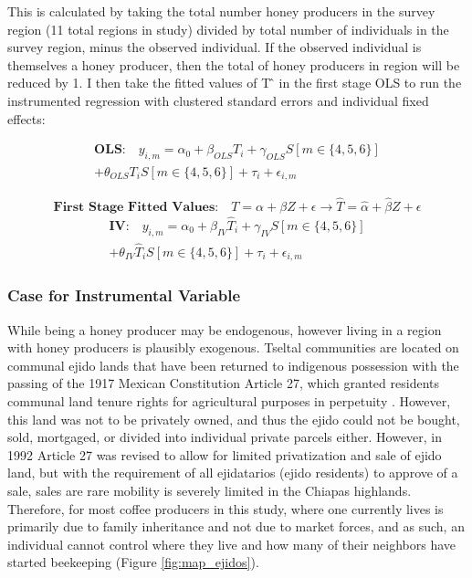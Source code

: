 \documentclass[../main.tex]{subfiles}
\begin{document}
This is calculated by taking the total number honey producers in the survey region (11 total regions in study) divided by total number of individuals in the survey region, minus the observed individual. If the observed individual is themselves a honey producer, then the total of honey producers in region will be reduced by 1. I then take the fitted values of T ̂ in the first stage OLS to run the instrumented regression with clustered standard errors and individual fixed effects:

\begin{multline}
\label{eq:2sls_OLS}
\textbf{OLS:}\quad y_{i,m} = \alpha_0 + \beta_{OLS}{T}_{i} + \gamma _{OLS}{S}[m \in \{4,5,6\}] \\ + \theta_{OLS}{T}_{i}{S}[m \in \{4,5,6\}] + \tau_{i} + \epsilon_{i,m}    
\end{multline}

\begin{equation}
\label{eq:2sls_1st_Stage}
\textbf{First Stage Fitted Values:}\quad T = \alpha + \beta{Z} + \epsilon \to \hat{T} = \hat{\alpha} + \hat{\beta}Z + \epsilon 
\end{equation}
\begin{multline}
\label{eq:2sls_2nd_Stage}
\textbf{IV:}\quad y_{i,m} = \alpha_0 + \beta_{IV}\hat{T}_{i} + \gamma_{IV}{S}[m \in \{4,5,6\}] \\ +  \theta_{IV}\hat{T}_{i}{S}[m \in \{4,5,6\}] + \tau_{i} + \epsilon_{i,m}    
\end{multline}

\subsubsection{Case for Instrumental Variable}

While being a honey producer may be endogenous, however living in a region with honey producers is plausibly exogenous. Tseltal communities are located on communal ejido lands that have been returned to indigenous possession with the passing of the 1917 Mexican Constitution Article 27, which granted residents communal land tenure rights for agricultural purposes in perpetuity \parencite{jones_privatizing_1998}. However, this land was not to be privately owned, and thus the ejido could not be bought, sold, mortgaged, or divided into individual private parcels either. However, in 1992 Article 27 was revised to allow for limited privatization and sale of ejido land, but with the requirement of all ejidatarios (ejido residents) to approve of a sale, sales are rare mobility is severely limited in the Chiapas highlands. Therefore, for most coffee producers in this study, where one currently lives is primarily due to family inheritance and not due to market forces, and as such, an individual cannot control where they live and how many of their neighbors have started beekeeping (Figure \ref{fig:map_ejidos}).
\end{document}

